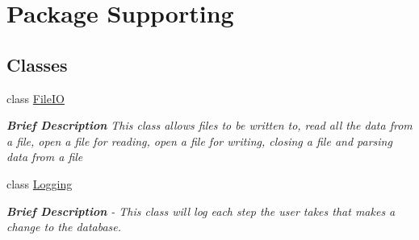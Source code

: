 \hypertarget{namespace_supporting}{}\section{Package Supporting}
\label{namespace_supporting}
\subsection*{Classes}
\begin{DoxyCompactItemize}
\item 
class \hyperlink{class_supporting_1_1_file_i_o}{File\+I\+O}
\begin{DoxyCompactList}\small\item\em {\bfseries Brief Description} This class allows files to be written to, read all the data from a file, open a file for reading, open a file for writing, closing a file and parsing data from a file \end{DoxyCompactList}\item 
class \hyperlink{class_supporting_1_1_logging}{Logging}
\begin{DoxyCompactList}\small\item\em {\bfseries Brief Description} -\/ This class will log each step the user takes that makes a change to the database. \end{DoxyCompactList}\end{DoxyCompactItemize}
